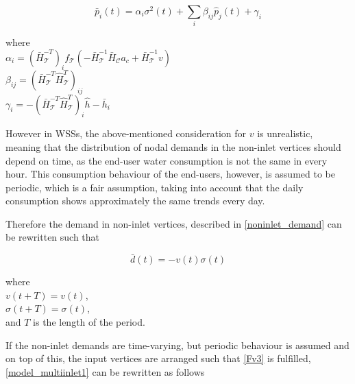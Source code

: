 \begin{equation}
\label{model_multiinlet1}
\bar{p}_i(t) = \alpha_i \sigma^2(t) + \sum_i \beta_{ij} \hat{p}_j(t) + \gamma_i
\end{equation}

  \begin{minipage}[t]{0.50\textwidth}
where\\
\hspace*{8mm} $ \alpha_i = (\bar{H}^{-T}_{\mathcal{T}})_i f_{\mathcal{T}}(-\bar{H}^{-1}_{\mathcal{T}} \bar{H}_{\mathcal{C}} a_c + \bar{H}^{-1}_{\mathcal{T}} v)$ \\
\vspace*{7pt}
\hspace*{8mm} $ \beta_{ij} = (\bar{H}^{-T}_{\mathcal{T}}\hat{H}^{T}_{\mathcal{T}})_{ij} $ \\
\vspace*{7pt}
\hspace*{8mm} $ \gamma_{i} = -(\bar{H}^{-T}_{\mathcal{T}}\hat{H}^{T}_{\mathcal{T}})_{i}\hat{h} - \bar{h}_i $ 

\end{minipage}

However in WSSs, the above-mentioned consideration for $v$ is unrealistic, meaning that the distribution of nodal demands in the non-inlet vertices should depend on time, as the end-user water consumption is not the same in every hour. This consumption behaviour of the end-users, however, is assumed to be periodic, which is a fair assumption, taking into account that the daily consumption shows approximately the same trends every day. 

Therefore the demand in non-inlet vertices, described in \eqref{noninlet_demand} can be rewritten such that

\begin{equation}
\label{noninlet_demand_time_varying}
\bar{d}(t) = - v(t) \sigma(t)
\end{equation}

\begin{minipage}[t]{0.45\textwidth}
where\\
\hspace*{8mm} $v(t+T) = v(t)$,\\
\hspace*{8mm} $\sigma(t+T) = \sigma(t)$,\\
\hspace*{8mm} and $T$ is the length of the period.
\end{minipage}

If the non-inlet demands are time-varying, but periodic behaviour is assumed and on top of this, the input vertices are arranged such that \eqref{Fv3} is fulfilled, \eqref{model_multiinlet1} can be rewritten as follows

